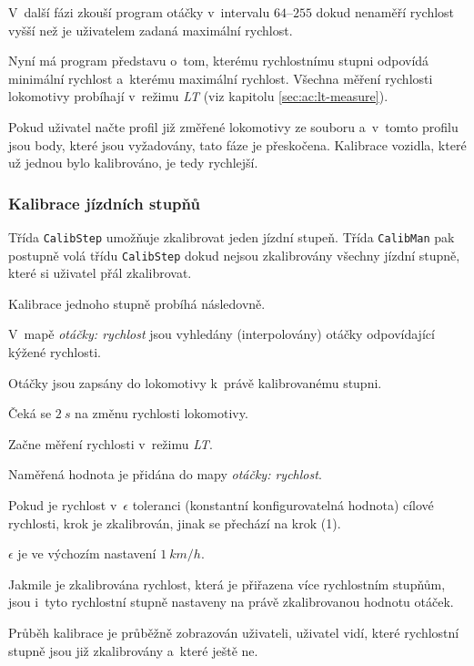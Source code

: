V~další fázi zkouší program otáčky v~intervalu $64$--$255$ dokud nenaměří
rychlost vyšší než je uživatelem zadaná maximální rychlost.

Nyní má program představu o~tom, kterému rychlostnímu stupni odpovídá minimální
rychlost a~kterému maximální rychlost. Všechna měření rychlosti lokomotivy
probíhají v~režimu \textit{LT} (viz kapitolu \ref{sec:ac:lt-measure}).

Pokud uživatel načte profil již změřené lokomotivy ze souboru a~v~tom\-to profilu
jsou body, které jsou vyžadovány, tato fáze je přeskočena. Kalibrace vozidla,
které už jednou bylo kalibrováno, je tedy rychlejší.

\subsubsection{Kalibrace jízdních stupňů}

Třída \texttt{CalibStep} umožňuje zkalibrovat jeden jízdní stupeň. Třída
\texttt{CalibMan} pak postupně volá třídu \texttt{CalibStep} dokud nejsou
zkalibrovány všechny jízdní stupně, které si uživatel přál zkalibrovat.

Kalibrace jednoho stupně probíhá následovně.

\begin{compactenum}
\item V~mapě \textit{otáčky: rychlost} jsou vyhledány (interpolovány) otáčky odpovídající
      kýžené rychlosti.
\item Otáčky jsou zapsány do lokomotivy k~právě kalibrovanému stupni.
\item Čeká se $2\ s$ na změnu rychlosti lokomotivy.
\item Začne měření rychlosti v~režimu \textit{LT}.
\item Naměřená hodnota je přidána do mapy \textit{otáčky: rychlost}.
\item Pokud je rychlost v~$\epsilon$ toleranci (konstantní konfigurovatelná hodnota)
      cílové rychlosti, krok je zkalibrován, jinak se přechází na krok (1).
\end{compactenum}

$\epsilon$ je ve výchozím nastavení $1\ km/h$.

Jakmile je zkalibrována rychlost, která je přiřazena více rychlostním stupňům,
jsou i~tyto rychlostní stupně nastaveny na právě zkalibrovanou hodnotu otáček.

Průběh kalibrace je průběžně zobrazován uživateli, uživatel vidí, které
rychlostní stupně jsou již zkalibrovány a~které ještě ne.

